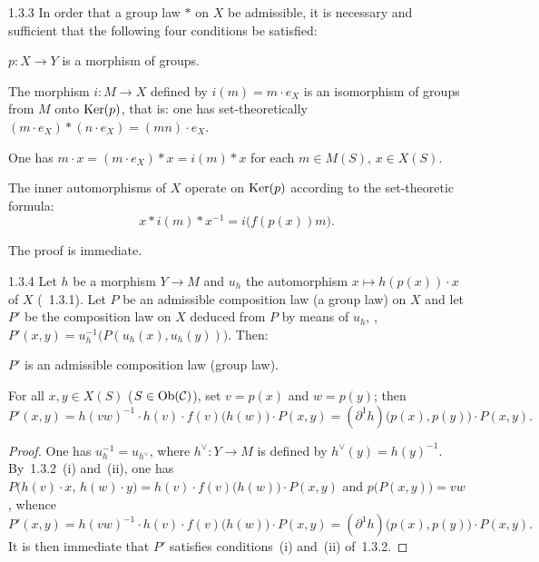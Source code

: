 \begin{proposition}{1.3.3}
\label{III.1.3.3}
In order that a group law \(*\) on \(X\) be admissible, it is necessary and
sufficient that the following four conditions be satisfied:
\begin{enumeratei}
\item \(p\colon X\to Y\) is a morphism of groups.
\item The morphism \(i\colon M\to X\) defined by \(i(m)=m\cdot e_{X}\) is an
isomorphism of groups from \(M\) onto \(\operatorname{Ker}(p)\), that is: one has
set-theoretically \((m\cdot e_{X})*(n\cdot e_{X})=(mn)\cdot e_{X}\).
\item One has \(m\cdot x=(m\cdot e_{X})*x=i(m)*x\) for each
\(m\in M(S)\), \(x\in X(S)\).
\item The inner automorphisms of \(X\) operate on \(\operatorname{Ker}(p)\) according to
the set-theoretic formula:
\[
x*i(m)*x^{-1}=i\bigl(f(p(x))m\bigr).
\]
\end{enumeratei}
\end{proposition}

The proof is immediate.

\begin{lemma}{1.3.4}
\label{III.1.3.4}
{\renewcommand{\thefootnote}{(48)}}
Let \(h\) be a morphism \(Y\to M\) and \(u_{h}\) the automorphism
\(x\mapsto h(p(x))\cdot x\) of \(X\) (\cf~1.3.1). Let \(P\) be an admissible
composition law (\resp a group law) on \(X\) and let \(P'\) be the
composition law on \(X\) deduced from \(P\) by means of \(u_{h}\), \ie,
\(P'(x,y)=u_{h}^{-1}\bigl(P(u_{h}(x),u_{h}(y))\bigr)\). Then:
\begin{enumeratei}
\item \(P'\) is an admissible composition law (\resp group law).
\item For all \(x,y\in X(S)\) (\(S\in\operatorname{Ob}(\mathcal{C})\)), set \(v=p(x)\) and
\(w=p(y)\); then
\[
P'(x,y)
=h(vw)^{-1}\cdot h(v)\cdot f(v)\bigl(h(w)\bigr)\cdot P(x,y)
=(\partial^{1}h)\bigl(p(x),p(y)\bigr)\cdot P(x,y).
\]
\end{enumeratei}
\end{lemma}

\begin{proof}
One has \(u_{h}^{-1}=u_{h^{\vee}}\), where \(h^{\vee}\colon Y\to M\) is
defined by \(h^{\vee}(y)=h(y)^{-1}\).
By~1.3.2~(i) and~(ii), one has
\(P\bigl(h(v)\cdot x,\, h(w)\cdot y\bigr)
=h(v)\cdot f(v)\bigl(h(w)\bigr)\cdot P(x,y)\)
and \(p\bigl(P(x,y)\bigr)=vw\), whence
\[
P'(x,y)
=h(vw)^{-1}\cdot h(v)\cdot f(v)\bigl(h(w)\bigr)\cdot P(x,y)
=(\partial^{1}h)\bigl(p(x),p(y)\bigr)\cdot P(x,y).
\]
It is then immediate that \(P'\) satisfies conditions~(i) and~(ii)
of~1.3.2.
\end{proof}

